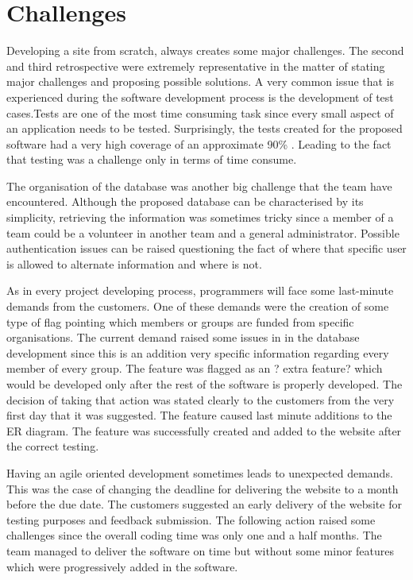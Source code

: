 \documentclass{l3proj}
\begin{document}

\section{Challenges}
\label{challenges}

Developing a site from scratch, always creates some major challenges. The second and third retrospective were extremely representative in the matter of stating major challenges and proposing possible solutions. A very common issue that is experienced during the software development process is the development of test cases.Tests are one of the most time consuming task since every small aspect of an application needs to be tested. Surprisingly, the tests created for the proposed software had a very high coverage of an approximate 90\% . Leading to the fact that testing was a challenge only in terms of time consume.

The organisation of the database was another big challenge that the team have encountered. Although the proposed database can be characterised by its simplicity, retrieving the information was sometimes tricky since a member of a team could be a volunteer in another team and a general administrator. Possible authentication issues can be raised questioning the fact of where that specific user is allowed to alternate information and where is not.

As in every project developing process, programmers will face some last-minute demands from the customers. One of these demands were the creation of some type of flag pointing which members or groups are funded from specific organisations. The current demand raised some issues in in the database development since this is an addition very specific information regarding every member of every group. The feature was flagged as an ? extra feature? which would be developed only after the rest of the software is properly developed. The decision of taking that action was stated clearly to the customers from the very first day that it was suggested. The feature caused last minute additions to the ER diagram. The feature was successfully created and added to the website after the correct testing.

Having an agile oriented development sometimes leads to unexpected demands. This was the case of changing the deadline for delivering the website to a month before the due date. The customers suggested an early delivery of the website for testing purposes and feedback submission. The following action raised some challenges since the overall coding time was only one and a half months. The team managed to deliver the software on time but without some minor features which were progressively added in the software.
\end{document}
